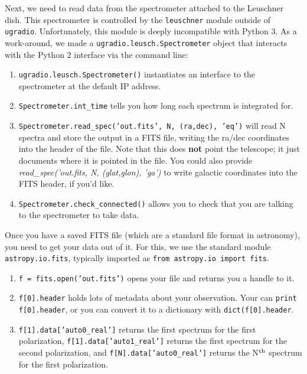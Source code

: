 \documentclass[psfig,preprint]{aastex}
\begin{document}
Next, we need to read data from the spectrometer attached to the Leuschner dish.  This
spectrometer is controlled by the {\tt leuschner} module outside of {\tt ugradio}. Unfortunately, this module is deeply incompatible with Python 3.
As a work-around, we made a {\tt ugradio.leusch.Spectrometer} object that
interacts with the Python 2 interface via the command line:
\begin{enumerate}
\item {\tt ugradio.leusch.Spectrometer()} instantiates an interface to the spectrometer
at the default IP address.
\item {\tt Spectrometer.int\_time} tells you how long each spectrum is integrated for.
\item {\tt Spectrometer.read\_spec('out.fits', N, (ra,dec), 'eq')} will read N spectra and
store the output in a FITS file, writing the ra/dec coordinates into the header of the file.  Note that
this does {\bf not} point the telescope; it just documents where it is pointed in the file.  You
could also provide {\it read\_spec('out.fits, N, (glat,glon), 'ga')} to write galactic coordinates
into the FITS header, if you'd like.
\item {\tt Spectrometer.check\_connected()} allows you to check that you are talking to the spectrometer to take data.
\end{enumerate}

Once you have a saved FITS file (which are a standard file format in astronomy), you need to get your data out of it.  For this,
we use the standard module {\tt astropy.io.fits}, typically imported as
{\tt from astropy.io import fits}.
\begin{enumerate}
\item {\tt f = fits.open('out.fits')} opens your file and returns you a handle to it.
\item {\tt f[0].header} holds lots of metadata about your observation.  Your can {\tt print f[0].header},
or you can convert it to a dictionary with {\tt dict(f[0].header}.
\item {\tt f[1].data['auto0\_real']} returns the first spectrum for the first polarization, {\tt f[1].data['auto1\_real']} returns the first spectrum for the second polarization, and {\tt f[N].data['auto0\_real']} returns the N$^{\rm th}$
spectrum for the first polarization.
\end{enumerate}
\end{document}
